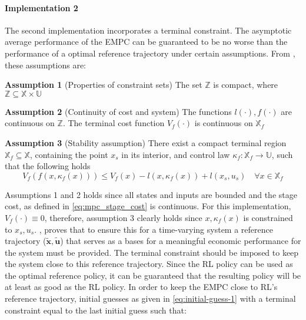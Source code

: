 \paragraph{Implementation 2}
The second implementation incorporates a terminal constraint. The asymptotic average performance of the EMPC can be guaranteed to be no worse than the performance of a optimal reference trajectory under certain assumptions. From \cite{amritEconomicOptimizationUsing2011}, these assumptions are:

\hspace{1cm} \textbf{Assumption 1} (Properties of constraint sets) The set $\mathbb{Z}$ is compact, where $\mathbb{Z} \subseteq \mathbb{X} \times \mathbb{U}$

\hspace{1cm} \textbf{Assumption 2}  (Continuity of cost and system) The functions $l(\cdot), f(\cdot)$ are continuous on $\mathbb{Z}$. The terminal cost function $V_f(\cdot)$ is continuous on $\mathbb{X}_f$ 

\hspace{1cm} \textbf{Assumption 3} (Stability assumption) There exist a compact terminal region $\mathbb{X}_f \subseteq \mathbb{X}$, containing the point $x_s$ in its interior, and control law $\kappa_f : \mathbb{X}_f \rightarrow \mathbb{U}$, such that the following holds 
\begin{equation}\label{eq:assumption_3}
	V_f(f(x,\kappa_f(x))) \leq V_f(x) - l(x,\kappa_f(x)) + l(x_s,u_s) \quad \forall x \in \mathbb{X}_f
\end{equation}

Assumptions 1 and 2 holds since all states and inputs are bounded and the stage cost, as defined in \autoref{eq:mpc_stage_cost} is continuous. For this implementation, $V_f(\cdot) \equiv 0$, therefore, assumption 3 clearly holds since $x,\kappa_f(x)$ is constrained to $x_s,u_s$.
 \cite{risbeckEconomicModelPredictive2020}, \cite{amritEconomicOptimizationUsing2011} proves that to ensure this for a time-varying system a reference trajectory ($\tilde{\mathbf{x}},\tilde{\mathbf{u}}$) that serves as a bases for a meaningful economic performance for the system must be provided. The terminal constraint should be imposed to keep the system close to this reference trajectory. Since the RL policy can be used as the optimal reference policy, it can be guaranteed that the resulting policy will be at least as good as the RL policy. In order to keep the EMPC close to RL's reference trajectory, initial guesses as given in \autoref{eq:initial-guess-1} with a terminal constraint equal to the last initial guess such that:

